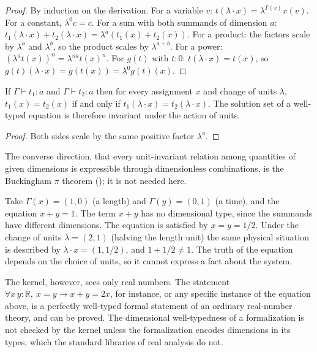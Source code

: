 \begin{proof}
By induction on the derivation. For a variable $v$: $t(\lambda\cdot x)=\lambda^{\Gamma(v)}x(v)$. For a constant, $\lambda^0c=c$. For a sum with both summands of dimension $a$: $t_1(\lambda\cdot x)+t_2(\lambda\cdot x)=\lambda^a(t_1(x)+t_2(x))$. For a product: the factors scale by $\lambda^a$ and $\lambda^b$, so the product scales by $\lambda^{a+b}$. For a power: $(\lambda^at(x))^n=\lambda^{na}t(x)^n$. For $g(t)$ with $t:0$: $t(\lambda\cdot x)=t(x)$, so $g(t)(\lambda\cdot x)=g(t(x))=\lambda^0g(t)(x)$.
\end{proof}

\begin{corollary}
\label{cor:unit-invariance}
If $\Gamma\vdash t_1:a$ and $\Gamma\vdash t_2:a$ then for every assignment $x$ and change of units $\lambda$, $t_1(x)=t_2(x)$ if and only if $t_1(\lambda\cdot x)=t_2(\lambda\cdot x)$. The solution set of a well-typed equation is therefore invariant under the action of units.
\end{corollary}

\begin{proof}
Both sides scale by the same positive factor $\lambda^a$.
\end{proof}

The converse direction, that every unit-invariant relation among quantities of given dimensions is expressible through dimensionless combinations, is the Buckingham $\pi$ theorem (); it is not needed here.

\begin{example}
\label{ex:ill-typed}
Take $\Gamma(x)=(1,0)$ (a length) and $\Gamma(y)=(0,1)$ (a time), and the equation $x+y=1$. The term $x+y$ has no dimensional type, since the summands have different dimensions. The equation is satisfied by $x=y=1/2$. Under the change of units $\lambda=(2,1)$ (halving the length unit) the same physical situation is described by $\lambda\cdot x=(1,1/2)$, and $1+1/2\ne1$. The truth of the equation depends on the choice of units, so it cannot express a fact about the system.

The kernel, however, sees only real numbers. The statement $\forall x\,y:\mathbb{R},\ x=y\to x+y=2x$, for instance, or any specific instance of the equation above, is a perfectly well-typed formal statement of an ordinary real-number theory, and can be proved. The dimensional well-typedness of a formalization is not checked by the kernel unless the formalization encodes dimensions in its types, which the standard libraries of real analysis do not.
\end{example}

